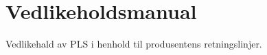 \section{Vedlikeholdsmanual}
\thispagestyle{fancy}

Vedlikehald av PLS i henhold til produsentens retningslinjer.
 